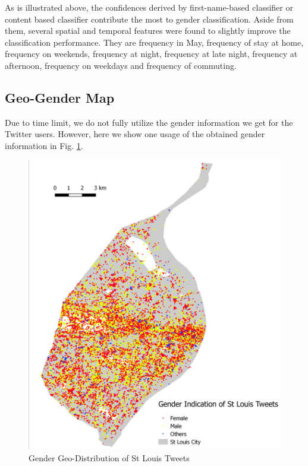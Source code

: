 \documentclass{article}
\begin{document}
As is illustrated above, the confidences derived by first-name-based classifier or content based classifier contribute the most to gender classification. Aside from them, several spatial and temporal features were found to slightly improve the classification performance. They are frequency in May, frequency of stay at home, frequency on weekends, frequency at night, frequency at late night, frequency at afternoon, frequency on weekdays and frequency of commuting.

\subsection{Geo-Gender Map}
Due to time limit, we do not fully utilize the gender information we get for the Twitter users. However, here we show one usage of the obtained gender information in Fig. \ref{fig3}.

\begin{figure}[ht]
\vskip 0.2in
\begin{center}
\centerline{\includegraphics[width=\columnwidth]{fig3}}
\caption{Gender Geo-Distribution of St Louis Tweets}
\label{fig3}
\end{center}
\vskip -0.2in
\end{figure} 
\end{document}
